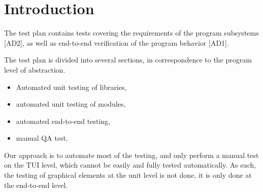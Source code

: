 \section{Introduction}
The test plan contains tests covering the requirements of the program
subsystems [AD2], as well as end-to-end verification of the program
behavior [AD1].

The test plan is divided into several sections, in correspondence to the
program level of abstraction.
\begin{itemize}
\item Automated unit testing of libraries,
\item automated unit testing of modules,
\item automated end-to-end testing,
\item manual QA test.
\end{itemize}

Our approach is to automate most of the testing, and only perform a manual
test on the \gls{TUI} level, which cannot be easily and fully tested
automatically. As such, the testing of graphical elements at the unit level
is not done, it is only done at the end-to-end level.

